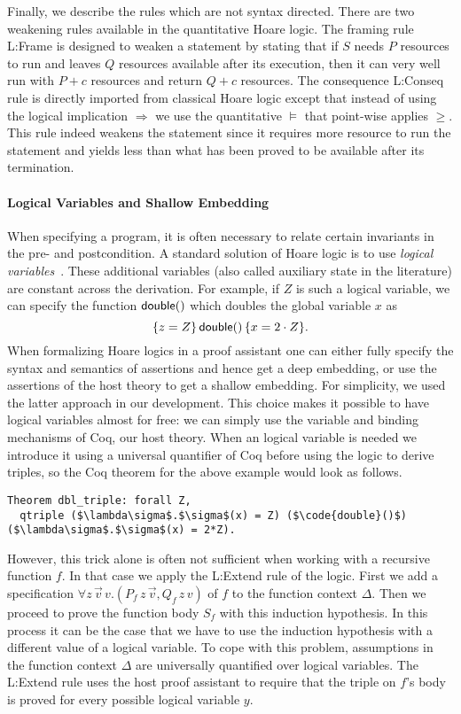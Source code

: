 \documentclass[nocopyrightspace,preprint]{sigplanconf}
\begin{document}
Finally, we describe the rules which are not syntax directed.  There
are two weakening rules available in the quantitative Hoare logic.
The framing rule {\sc L:Frame} is designed to weaken a statement by
stating that if $S$ needs $P$ resources to run and leaves $Q$
resources available after its execution, then it can very well run
with $P + c$ resources and return $Q + c$ resources.  The consequence
{\sc L:Conseq} rule is directly imported from classical Hoare logic
except that instead of using the logical implication $\Rightarrow$ we
use the quantitative $\models$ that point-wise applies $\ge$.  This
rule indeed weakens the statement since it requires more resource to
run the statement and yields less than what has been proved to be
available after its termination.


\paragraph{Logical Variables and Shallow Embedding}

When specifying a program, it is often necessary to relate certain
invariants in the pre- and postcondition.  A standard solution of Hoare
logic is to use \emph{logical variables}~\cite{Kleymann99}.  These
additional variables (also called auxiliary state in the literature)
are constant across the derivation.  For example, if $Z$ is such
a logical variable, we can specify the function $\mathsf{double}()$
which doubles the global variable $x$ as
$$
  \{z = Z\}\, \mathsf{double}()\, \{x = 2 \cdot Z\}.
$$
%
When formalizing Hoare logics in a proof assistant one can either
fully specify the syntax and semantics of assertions and hence get a
deep embedding, or use the assertions of the host theory to get a
shallow embedding.  For simplicity, we used the latter approach in our
development.  This choice makes it possible to have logical variables
almost for free: we can simply use the variable and binding mechanisms
of Coq, our host theory.  When an logical variable is needed we
introduce it using a universal quantifier of Coq before using the
logic to derive triples, so the Coq theorem for the above example
would look as follows.
%
\begin{lstlisting}
Theorem dbl_triple: forall Z,
  qtriple ($\lambda\sigma$.$\sigma$(x) = Z) ($\code{double}()$) ($\lambda\sigma$.$\sigma$(x) = 2*Z).
\end{lstlisting}
%
However, this trick alone is often not sufficient when working with a
recursive function $f$.  In that case we apply the {\sc L:Extend} rule
of the logic.  First we add a specification $\forall z\,\vec
v\,v.(P_f\,z\,\vec v, Q_f\,z\,v)$ of $f$ to the function context
$\Delta$.  Then we proceed to prove the function body $S_f$ with this
induction hypothesis.  In this process it can be the case that we
have to use the induction hypothesis with a different value of a
logical variable.  To cope with this problem, assumptions in the
function context $\Delta$ are universally quantified over logical
variables.  The {\sc L:Extend} rule uses the host proof assistant to
require that the triple on $f$'s body is proved for every possible
logical variable $y$.
\end{document}
